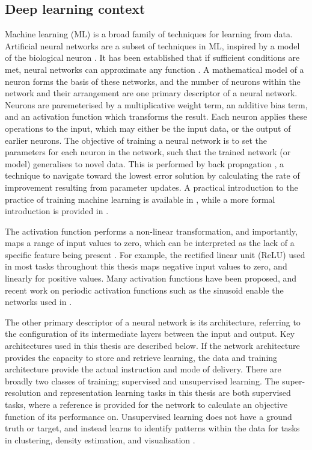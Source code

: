 \subsection{Deep learning context}
Machine learning (ML) is a broad family of techniques for learning from data.
Artificial neural networks are a subset of techniques in ML, inspired by a model of the biological neuron \parencite{bishopNeuralNetworksPattern1995}.
It has been established that if sufficient conditions are met, neural networks can approximate any function \parencite{hornikMultilayerFeedforwardNetworks1989}.
A mathematical model of a neuron forms the basis of these networks, and the number of neurons within the network and their arrangement are one primary descriptor of a neural network.
Neurons are paremeterised by a multiplicative weight term, an additive bias term, and an activation function which transforms the result.
Each neuron applies these operations to the input, which may either be the input data, or the output of earlier neurons.
The objective of training a neural network is to set the parameters for each neuron in the network, such that the trained network (or model) generalises to novel data.
This is performed by back propagation \parencite{rumelhartLearningRepresentationsBackpropagating1988}, a technique to navigate toward the lowest error solution by calculating the rate of improvement resulting from parameter updates.
A practical introduction to the practice of training machine learning is available in \textcite{stevensDeepLearningPyTorch2020}, while a more formal introduction is provided in \textcite{bishopPatternRecognitionMachine2006}.

The activation function performs a non-linear transformation, and importantly, maps a range of input values to zero, which can be interpreted as the lack of a specific feature being present \parencite{williamsLogicActivationFunctions1986}.
For example, the rectified linear unit (ReLU) used in most tasks throughout this thesis maps negative input values to zero, and linearly for positive values.
Many activation functions have been proposed, and recent work on periodic activation functions such as the sinusoid \parencite{sitzmann2019siren} enable the networks used in .

The other primary descriptor of a neural network is its architecture, referring to the configuration of its intermediate layers between the input and output.
Key architectures used in this thesis are described below.
If the network architecture provides the capacity to store and retrieve learning, the data and training architecture provide the actual instruction and mode of delivery.
There are broadly two classes of training; supervised and unsupervised learning.
The super-resolution and representation learning tasks in this thesis are both supervised tasks, where a reference is provided for the network to calculate an objective function of its performance on.
Unsupervised learning does not have a ground truth or target, and instead learns to identify patterns within the data for tasks in clustering, density estimation, and visualisation \parencite{bishopPatternRecognitionMachine2006}.

